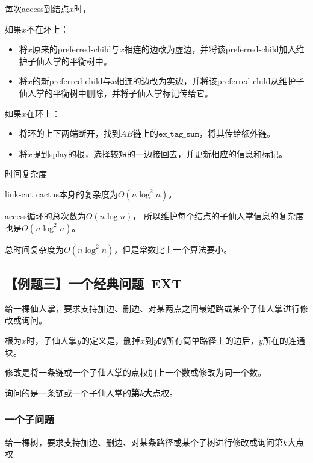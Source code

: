 \documentclass{noithesis}
\begin{document}
每次access到结点$x$时，

如果$x$不在环上：
\begin{itemize}
\setlength{\parskip}{-7pt}
\item 将$x$原来的preferred-child与$x$相连的边改为虚边，并将该preferred-child加入维护子仙人掌的平衡树中。
\item 将$x$的新preferred-child与$x$相连的边改为实边，并将该preferred-child从维护子仙人掌的平衡树中删除，并将子仙人掌标记传给它。
\end{itemize}

如果$x$在环上：
\begin{itemize}
\setlength{\parskip}{-7pt}
\item 将环的上下两端断开，找到$A B$链上的$\texttt{ex\_tag\_sum}$，将其传给额外链。
\item 将$x$提到splay的根，选择较短的一边接回去，并更新相应的信息和标记。
\end{itemize}


$\textbf{时间复杂度}$

link-cut cactus本身的复杂度为$O(n \log ^ 2 n)$。

access循环的总次数为$O(n \log n)$，
所以维护每个结点的子仙人掌信息的复杂度也是$O(n \log ^ 2 n)$。

总时间复杂度为$O(n \log ^ 2 n)$，但是常数比上一个算法要小。






\subsection{【例题三】一个经典问题\ EXT}

给一棵仙人掌，要求支持加边、删边、对某两点之间最短路或某个子仙人掌进行修改或询问。

根为$x$时，子仙人掌$y$的定义是，删掉$x$到$y$的所有简单路径上的边后，$y$所在的连通块。

修改是将一条链或一个子仙人掌的点权加上一个数或修改为同一个数。

询问的是一条链或一个子仙人掌的\textbf{第$k$大}点权。

\text{}

\subsubsection{一个子问题}

给一棵树，要求支持加边、删边、对某条路径或某个子树进行修改或询问第$k$大点权

\text{}
\end{document}
